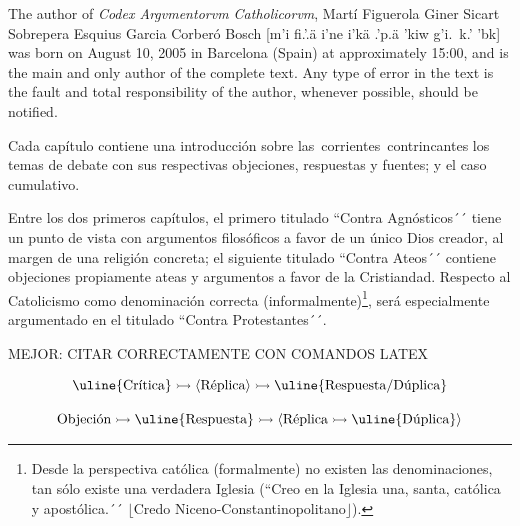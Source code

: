 \documentclass[12pt]{report}
\newcommand{\titlename}{Codex Argvmentorvm Catholicorvm}
\begin{document}
	
	
	The author of \textit{\titlename}, Martí Figuerola Giner Sicart Sobrepera Esquius Garcia Corberó Bosch [m\textturna\textfishhookr'i fi.\textlowering{\textgamma}'\textfishhookr{}.\textltilde ä \textyogh i'ne i'kä\textfishhookr{} .\textlowering{\textbeta}\textfishhookr {}'p.\textfishhookr ä \textturna {}'kiw g\textturna\textfishhookr'i.\textturna\ k\textfishhookr.\textlowering{\textbeta}'\textfishhookr{} 'b\textopeno {}k] was born on August 10, 2005 in Barcelona (Spain) at approximately 15:00, and is the main and only author of the complete text. Any type of error in the text is the fault and total responsibility of the author, whenever possible, should be notified.
	
	
	
	
	\addtoc
	
	
	
	
	
	Cada capítulo contiene una introducción sobre la\textlangle s\textrangle\ corriente\textlangle s\textrangle\ contrincante\textlangle s\textrangle\; los temas de debate con sus respectivas objeciones, respuestas y fuentes; y el caso cumulativo.
	
	Entre los dos primeros capítulos, el primero titulado ``Contra Agnósticos´´ tiene un punto de vista con argumentos filosóficos a favor de un único Dios creador, al margen de una religión concreta; el siguiente titulado ``Contra Ateos´´ contiene objeciones propiamente ateas y argumentos a favor de la Cristiandad. Respecto al Catolicismo como denominación correcta (informalmente)\footnote{Desde la perspectiva católica (formalmente) no existen las denominaciones, tan sólo existe una verdadera Iglesia (``Creo en la Iglesia una, santa, católica y apostólica.´´ $\lfloor$Credo Niceno-Constantinopolitano$\rfloor$).}, será especialmente argumentado en el titulado ``Contra Protestantes´´.
	
	MEJOR: CITAR CORRECTAMENTE CON COMANDOS LATEX
	
	
	\[
	\textrm{\uline{Crítica}} \rightarrowtail \langle\textrm{Réplica}\rangle \rightarrowtail \textrm{\uline{Respuesta/Dúplica}}
	\]
	
	\[
	\textrm{Objeción} \rightarrowtail \textrm{\uline{Respuesta}} \rightarrowtail \langle\textrm{Réplica} \rightarrowtail \textrm{\uline{Dúplica}}\rangle
	\]
	
\end{document}
